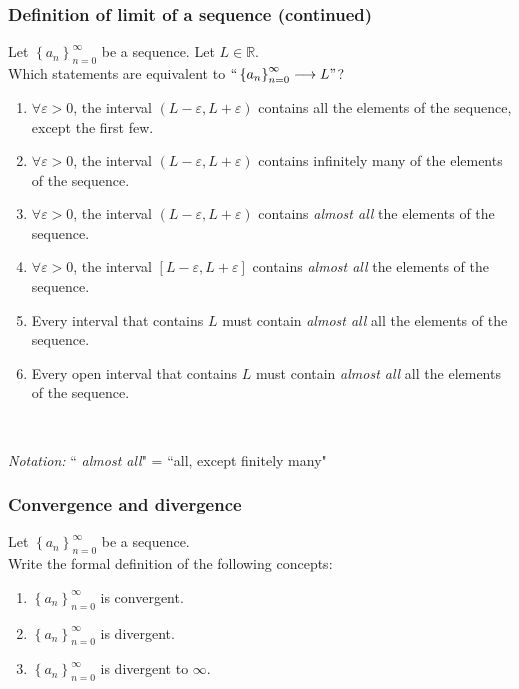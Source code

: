 \documentclass[14pt]{beamer}
\newcommand {\DS} [1] {${\displaystyle #1}$}
\newcommand {\R}{\mathbb{R}}
\newcommand{\e}{\varepsilon}
\newcommand{\rojo}[1]{{\color{red} #1}}
\newcommand{\setsize}[1]{\fontsize{#1}{#1}\selectfont} %
\newcommand{\an}{\left\{ a_n \right\}_{n=0}^{\infty}}
\begin{document}
\begin{frame}[t]
\setsize{12}
\frametitle{Definition of limit of a sequence  (continued)}


Let \DS{\an} be a sequence.  Let \DS{L \in \R}.  \\
Which statements are equivalent to  \DS{``\an \longrightarrow L"}?

\begin{enumerate}
\addtocounter{enumi}{9}
	\item  \DS{\forall \e >0}, the interval \DS{(L-\e, L+\e)} contains all the elements of the sequence, except the first few.
	\item  \DS{\forall \e >0}, the interval \DS{(L-\e, L+\e)} contains infinitely many of the elements of the sequence.
	\item  \DS{\forall \e >0}, the interval \DS{(L-\e, L+\e)} contains \emph{\rojo{almost all}} the elements of the sequence.
	\item  \DS{\forall \e >0}, the interval \DS{[L-\e, L+\e]} contains \emph{\rojo{almost all}} the elements of the sequence.
	\item  Every interval that contains $L$ must  contain \emph{\rojo{almost all}} all the elements of the sequence.
	\item  Every open interval that contains $L$ must  contain \emph{\rojo{almost all}} all the elements of the sequence.
\end{enumerate}

\

\emph{Notation:}  ``\emph{\rojo{almost all}}" = ``all, except finitely many"

\end{frame}
\begin{frame}[t]
\frametitle{Convergence and divergence}

Let \DS{\an} be a sequence.   \\ Write the formal definition of the following concepts:

	\begin{enumerate}
		\item  \DS{\an} is convergent.

\vfill
		\item  \DS{\an} is divergent.

\vfill
		\item  \DS{\an} is divergent to $\infty$.

\vfill
	\end{enumerate}

\end{frame}
\end{document}
